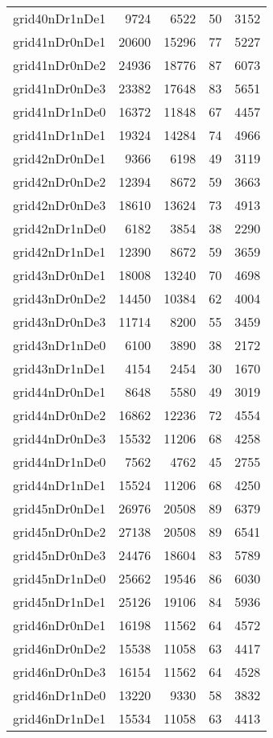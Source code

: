 \begin{tabular}{lrrrr}
grid40nDr1nDe1 & 9724 & 6522 & 50 & 3152 \\
grid41nDr0nDe1 & 20600 & 15296 & 77 & 5227 \\
grid41nDr0nDe2 & 24936 & 18776 & 87 & 6073 \\
grid41nDr0nDe3 & 23382 & 17648 & 83 & 5651 \\
grid41nDr1nDe0 & 16372 & 11848 & 67 & 4457 \\
grid41nDr1nDe1 & 19324 & 14284 & 74 & 4966 \\
grid42nDr0nDe1 & 9366 & 6198 & 49 & 3119 \\
grid42nDr0nDe2 & 12394 & 8672 & 59 & 3663 \\
grid42nDr0nDe3 & 18610 & 13624 & 73 & 4913 \\
grid42nDr1nDe0 & 6182 & 3854 & 38 & 2290 \\
grid42nDr1nDe1 & 12390 & 8672 & 59 & 3659 \\
grid43nDr0nDe1 & 18008 & 13240 & 70 & 4698 \\
grid43nDr0nDe2 & 14450 & 10384 & 62 & 4004 \\
grid43nDr0nDe3 & 11714 & 8200 & 55 & 3459 \\
grid43nDr1nDe0 & 6100 & 3890 & 38 & 2172 \\
grid43nDr1nDe1 & 4154 & 2454 & 30 & 1670 \\
grid44nDr0nDe1 & 8648 & 5580 & 49 & 3019 \\
grid44nDr0nDe2 & 16862 & 12236 & 72 & 4554 \\
grid44nDr0nDe3 & 15532 & 11206 & 68 & 4258 \\
grid44nDr1nDe0 & 7562 & 4762 & 45 & 2755 \\
grid44nDr1nDe1 & 15524 & 11206 & 68 & 4250 \\
grid45nDr0nDe1 & 26976 & 20508 & 89 & 6379 \\
grid45nDr0nDe2 & 27138 & 20508 & 89 & 6541 \\
grid45nDr0nDe3 & 24476 & 18604 & 83 & 5789 \\
grid45nDr1nDe0 & 25662 & 19546 & 86 & 6030 \\
grid45nDr1nDe1 & 25126 & 19106 & 84 & 5936 \\
grid46nDr0nDe1 & 16198 & 11562 & 64 & 4572 \\
grid46nDr0nDe2 & 15538 & 11058 & 63 & 4417 \\
grid46nDr0nDe3 & 16154 & 11562 & 64 & 4528 \\
grid46nDr1nDe0 & 13220 & 9330 & 58 & 3832 \\
grid46nDr1nDe1 & 15534 & 11058 & 63 & 4413 \\

\end{tabular}
